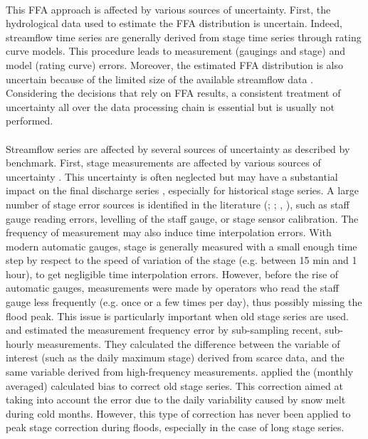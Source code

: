 \documentclass[11pt]{article}
\begin{document}
    \paragraph{}
    This FFA approach is affected by various sources of uncertainty. First, the hydrological data used to estimate the FFA distribution is uncertain. Indeed,
    streamflow time series are generally derived from stage time series through rating curve models. This procedure leads to measurement (gaugings and stage) and model (rating curve) errors. Moreover, the estimated FFA distribution is also uncertain because of the limited size of the available streamflow data \citep{kjeldsen_uncertainty_2011}. Considering the decisions that rely on FFA results, a consistent treatment of uncertainty all over the data processing chain is essential but is usually not performed.
    
    \paragraph{}
    Streamflow series are affected by several sources of uncertainty as described by \citet{mcmillan_benchmarking_2012} benchmark. First, stage measurements are affected by various sources of uncertainty \citep{horner_impact_2018}. This uncertainty is often neglected but may have a substantial impact on the final discharge series \citet{hamilton_quantifying_2012}, especially for historical stage series. A large number of stage error sources is identified in the literature (\citet{van_der_made_determination_1982}; \citet{petersen-overleir_uncertainty_2005}; \citet{mcmillan_benchmarking_2012}, \citet{horner_impact_2018}), such as staff gauge reading errors, levelling of the staff gauge, or stage sensor calibration. The frequency of measurement may also induce time interpolation errors. With modern automatic gauges, stage is generally measured with a small enough time step by respect to the speed of variation of the stage (e.g. between 15 min and 1 hour), to get negligible time interpolation errors. However, before the rise of automatic gauges, measurements were made by operators who read the staff gauge less frequently (e.g. once or a few times per day), thus possibly missing the flood peak. This issue is particularly important when old stage series are used. \citet{hamilton_quantifying_2012} and \citet{kuentz_hydrometrie_2014} estimated the measurement frequency error by sub-sampling recent, sub-hourly measurements. They calculated the difference between the variable of interest (such as the daily maximum stage) derived from scarce data, and the same variable derived from high-frequency measurements. \citet{kuentz_hydrometrie_2014} applied the (monthly averaged) calculated bias to correct old stage series. This correction aimed at taking into account the error due to the daily variability caused by snow melt during cold months. However, this type of correction has never been applied to peak stage correction during floods, especially in the case of long stage series.
    
\end{document}
